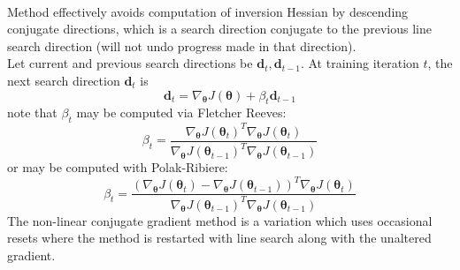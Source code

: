 \begin{remark} \\
Method effectively avoids computation of inversion Hessian by descending conjugate directions, which is a search direction conjugate to the previous line search direction (will not undo progress made in that direction).\\
Let current and previous search directions be $\bm{d}_{t}, \bm{d}_{t-1}$. At training iteration $t$, the next search direction $\bm{d}_t$ is
\begin{equation}
\bm{d}_t = \nabla_{\bm{\theta}} J(\bm{\theta}) + \beta_t \bm{d}_{t-1} \nonumber
\end{equation}
note that $\beta_t$ may be computed via Fletcher Reeves:
\begin{equation}
\beta_t = \frac{\nabla_{\bm{\theta}} J(\bm{\theta}_t)^T \nabla_{\bm{\theta}} J(\bm{\theta}_t)}{\nabla_{\bm{\theta}} J(\bm{\theta}_{t-1})^T \nabla_{\bm{\theta}} J(\bm{\theta}_{t-1})} \nonumber
\end{equation}
or may be computed with Polak-Ribiere:
\begin{equation}
\beta_t = \frac{(\nabla_{\bm{\theta}} J(\bm{\theta}_t) - \nabla_{\bm{\theta}} J(\bm{\theta}_{t-1}))^T \nabla_{\bm{\theta}} J(\bm{\theta}_t)}{\nabla_{\bm{\theta}} J(\bm{\theta}_{t-1})^T \nabla_{\bm{\theta}} J(\bm{\theta}_{t-1})} \nonumber
\end{equation}
The non-linear conjugate gradient method is a variation which uses occasional resets where the method is restarted with line search along with the unaltered gradient.
\end{remark}

